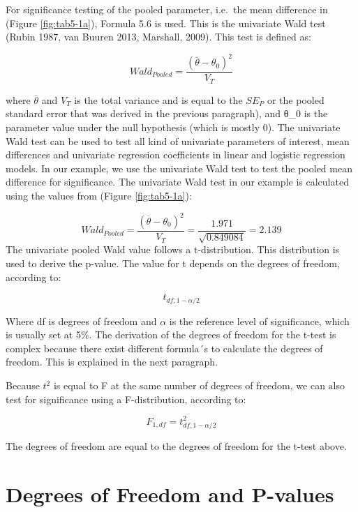 \documentclass[]{book}
\theoremstyle{definition}
\theoremstyle{definition}
\theoremstyle{definition}
\theoremstyle{remark}
\begin{document}
For significance testing of the pooled parameter, i.e.~the mean
difference in (Figure \ref{fig:tab5-1a}), Formula 5.6 is used. This is
the univariate Wald test (Rubin 1987, van Buuren 2013, Marshall, 2009).
This test is defined as:

\begin{equation}
Wald_{Pooled} =\frac{(\overline{\theta} - {\theta_0})^2}{V_T}
  \label{eq:wald-pooled}
\end{equation}

where \(\overline{\theta}\) and \(V_T\) is the total variance and is
equal to the \(SE_P\) or the pooled standard error that was derived in
the previous paragraph), and θ\_0 is the parameter value under the null
hypothesis (which is mostly 0). The univariate Wald test can be used to
test all kind of univariate parameters of interest, mean differences and
univariate regression coefficients in linear and logistic regression
models. In our example, we use the univariate Wald test to test the
pooled mean difference for significance. The univariate Wald test in our
example is calculated using the values from (Figure \ref{fig:tab5-1a}):

\[Wald_{Pooled} =\frac{(\overline{\theta} - {\theta_0})^2}{V_T}=\frac{1.971}{\sqrt{0.849084}}=2.139\]
The univariate pooled Wald value follows a t-distribution. This
distribution is used to derive the p-value. The value for t depends on
the degrees of freedom, according to:

\begin{equation}
t_{df,1-\alpha/2}
  \label{eq:t-distr}
\end{equation}

Where df is degrees of freedom and \(\alpha\) is the reference level of
significance, which is usually set at 5\%. The derivation of the degrees
of freedom for the t-test is complex because there exist different
formula´s to calculate the degrees of freedom. This is explained in the
next paragraph.

Because \(t^2\) is equal to F at the same number of degrees of freedom,
we can also test for significance using a F-distribution, according to:

\begin{equation}
F_{1, df}=t^2_{df,1-\alpha/2}
  \label{eq:f-distr}
\end{equation}

The degrees of freedom are equal to the degrees of freedom for the
t-test above.

\section{Degrees of Freedom and
P-values}\label{degrees-of-freedom-and-p-values}
\end{document}
